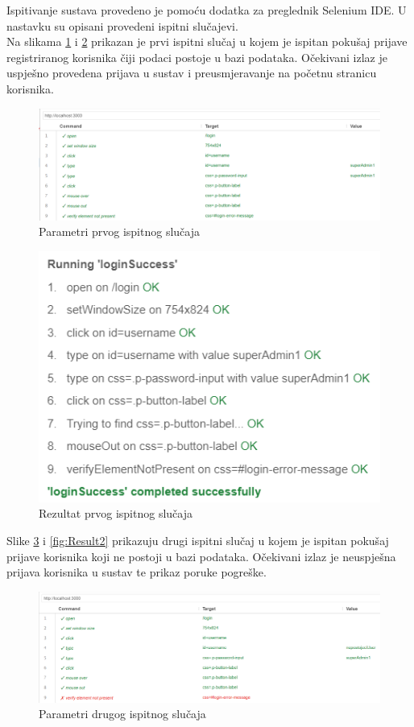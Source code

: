             Ispitivanje sustava provedeno je pomoću dodatka za preglednik Selenium IDE. U nastavku su opisani provedeni ispitni slučajevi. \\
            Na slikama \ref{fig:Params1} i \ref{fig:Result1} prikazan je prvi ispitni slučaj u kojem je ispitan pokušaj prijave registriranog korisnika čiji podaci postoje u bazi podataka. Očekivani izlaz je uspješno provedena prijava u sustav i preusmjeravanje na početnu stranicu korisnika. \\

                \begin{figure}[H]
                \centering
				\includegraphics[width=\linewidth]{slike/loginSuccessParams.png}
				\caption{Parametri prvog ispitnog slučaja }
				\label{fig:Params1}
			\end{figure}
   
                 \begin{figure}[H]
                 \centering
				\includegraphics[width=0.5\linewidth]{slike/loginSuccess.png}
				\caption{Rezultat prvog ispitnog slučaja}
				\label{fig:Result1}
			\end{figure}

			\eject
            Slike \ref{fig:Params2} i \ref{fig:Result2} prikazuju drugi ispitni slučaj u kojem je ispitan pokušaj prijave korisnika koji ne postoji u bazi podataka. Očekivani izlaz je neuspješna prijava korisnika u sustav te prikaz poruke pogreške.

                \begin{figure}[H]
                \centering
				\includegraphics[width=\linewidth]{slike/loginFailParams.png}
				\caption{Parametri drugog ispitnog slučaja }
				\label{fig:Params2}
			\end{figure}
   
